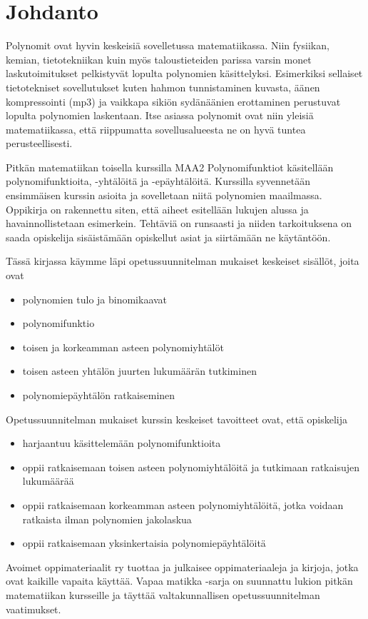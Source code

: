 \section{Johdanto}

Polynomit ovat hyvin keskeisiä sovelletussa matematiikassa. Niin fysiikan, kemian, tietotekniikan kuin myös taloustieteiden parissa varsin monet laskutoimitukset pelkistyvät lopulta polynomien käsittelyksi. Esimerkiksi sellaiset tietotekniset sovellutukset kuten hahmon tunnistaminen kuvasta, äänen kompressointi (mp3) ja vaikkapa sikiön sydänäänien erottaminen perustuvat lopulta polynomien laskentaan. Itse asiassa polynomit ovat niin yleisiä matematiikassa, että riippumatta sovellusalueesta ne on hyvä tuntea perusteellisesti.

Pitkän matematiikan toisella kurssilla MAA2 Polynomifunktiot käsitellään polynomifunktioita, -yhtälöitä ja -epäyhtälöitä. Kurssilla syvennetään ensimmäisen kurssin asioita ja sovelletaan niitä polynomien maailmassa. Oppikirja on rakennettu siten, että aiheet esitellään lukujen alussa ja havainnollistetaan esimerkein. Tehtäviä on runsaasti ja niiden tarkoituksena on saada opiskelija sisäistämään opiskellut asiat ja siirtämään ne käytäntöön.


Tässä kirjassa käymme läpi opetussuunnitelman mukaiset keskeiset sisällöt, joita ovat
\begin{itemize}
\item polynomien tulo ja binomikaavat
\item polynomifunktio
\item toisen ja korkeamman asteen polynomiyhtälöt
\item toisen asteen yhtälön juurten lukumäärän tutkiminen
\item polynomiepäyhtälön ratkaiseminen
\end{itemize}

Opetussuunnitelman mukaiset kurssin keskeiset tavoitteet ovat, että opiskelija
\begin{itemize}
\item harjaantuu käsittelemään polynomifunktioita
\item oppii ratkaisemaan toisen asteen polynomiyhtälöitä ja tutkimaan ratkaisujen lukumäärää
\item oppii ratkaisemaan korkeamman asteen polynomiyhtälöitä, jotka voidaan ratkaista ilman polynomien jakolaskua
\item oppii ratkaisemaan yksinkertaisia polynomiepäyhtälöitä
\end{itemize}

Avoimet oppimateriaalit ry tuottaa ja julkaisee oppimateriaaleja ja kirjoja, jotka ovat kaikille vapaita käyttää. Vapaa matikka -sarja on suunnattu lukion pitkän matematiikan kursseille ja täyttää valtakunnallisen opetussuunnitelman vaatimukset.